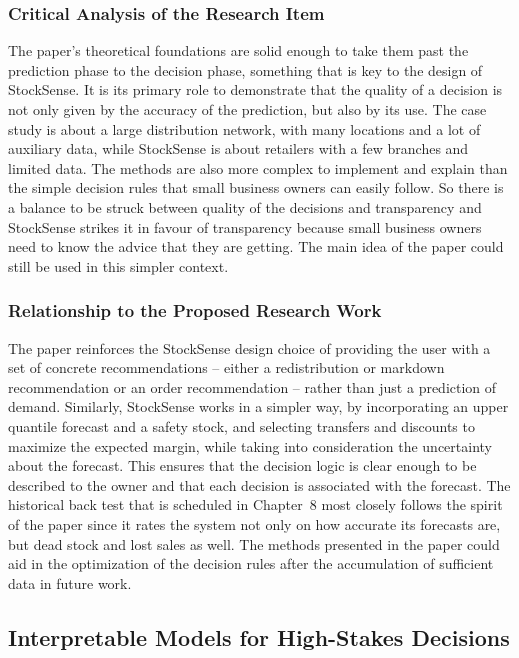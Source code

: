 \documentclass{StockSense}
\begin{document}
\subsubsection{Critical Analysis of the Research Item}

The paper's theoretical foundations are solid enough to take them past the prediction phase to the decision phase, something that is key to the design of StockSense. It is its primary role to demonstrate that the quality of a decision is not only given by the accuracy of the prediction, but also by its use. The case study is about a large distribution network, with many locations and a lot of auxiliary data, while StockSense is about retailers with a few branches and limited data. The methods are also more complex to implement and explain than the simple decision rules that small business owners can easily follow. So there is a balance to be struck between quality of the decisions and transparency and StockSense strikes it in favour of transparency because small business owners need to know the advice that they are getting. The main idea of the paper could still be used in this simpler context.

\subsubsection{Relationship to the Proposed Research Work}

The paper reinforces the StockSense design choice of providing the user with a set of concrete recommendations – either a redistribution or markdown recommendation or an order recommendation – rather than just a prediction of demand. Similarly, StockSense works in a simpler way, by incorporating an upper quantile forecast and a safety stock, and selecting transfers and discounts to maximize the expected margin, while taking into consideration the uncertainty about the forecast. This ensures that the decision logic is clear enough to be described to the owner and that each decision is associated with the forecast. The historical back test that is scheduled in Chapter~8 most closely follows the spirit of the paper since it rates the system not only on how accurate its forecasts are, but dead stock and lost sales as well. The methods presented in the paper could aid in the optimization of the decision rules after the accumulation of sufficient data in future work.

\subsection{Interpretable Models for High-Stakes Decisions}
\end{document}
